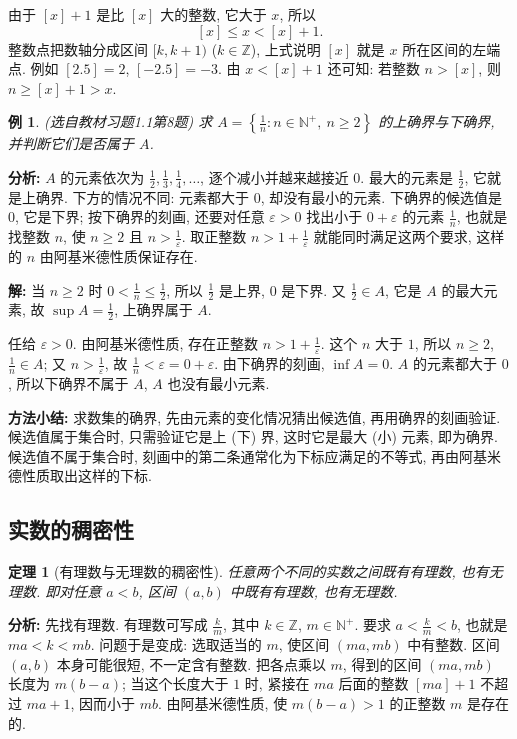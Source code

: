 \documentclass[UTF8,openany]{ctexbook}
\theoremstyle{chinesetextbook}
\newtheorem{example}{例}[section]
\newtheorem{theorem}{定理}[section]
\newenvironment{cnsolution}{\par\indent\textbf{解:} \ignorespaces}{\par}
\begin{document}
由于 $[x]+1$ 是比 $[x]$ 大的整数, 它大于 $x$, 所以
\[
[x]\le x<[x]+1.
\]
整数点把数轴分成区间 $[k,k+1)$ ($k\in\mathbb Z$), 上式说明 $[x]$ 就是 $x$ 所在区间的左端点. 例如 $[2.5]=2$, $[-2.5]=-3$. 由 $x<[x]+1$ 还可知: 若整数 $n>[x]$, 则 $n\ge[x]+1>x$.
\begin{example}
\textnormal{(选自教材习题1.1第8题)} 求 $\displaystyle A=\left\{\frac1n:n\in\mathbb N^+,\ n\ge2\right\}$ 的上确界与下确界, 并判断它们是否属于 $A$.
\end{example}
\par\indent\textbf{分析:} $A$ 的元素依次为 $\displaystyle\frac12,\frac13,\frac14,\ldots$, 逐个减小并越来越接近 $0$. 最大的元素是 $\displaystyle\frac12$, 它就是上确界. 下方的情况不同: 元素都大于 $0$, 却没有最小的元素. 下确界的候选值是 $0$, 它是下界; 按下确界的刻画, 还要对任意 $\varepsilon>0$ 找出小于 $0+\varepsilon$ 的元素 $\displaystyle\frac1n$, 也就是找整数 $n$, 使 $n\ge2$ 且 $\displaystyle n>\frac1\varepsilon$. 取正整数 $\displaystyle n>1+\frac1\varepsilon$ 就能同时满足这两个要求, 这样的 $n$ 由阿基米德性质保证存在.
\begin{cnsolution}
当 $n\ge2$ 时 $\displaystyle0<\frac1n\le\frac12$, 所以 $\displaystyle\frac12$ 是上界, $0$ 是下界. 又 $\displaystyle\frac12\in A$, 它是 $A$ 的最大元素, 故 $\displaystyle\sup A=\frac12$, 上确界属于 $A$.

任给 $\varepsilon>0$. 由阿基米德性质, 存在正整数 $\displaystyle n>1+\frac1\varepsilon$. 这个 $n$ 大于 $1$, 所以 $n\ge2$, $\displaystyle\frac1n\in A$; 又 $\displaystyle n>\frac1\varepsilon$, 故 $\displaystyle\frac1n<\varepsilon=0+\varepsilon$. 由下确界的刻画, $\inf A=0$. $A$ 的元素都大于 $0$, 所以下确界不属于 $A$, $A$ 也没有最小元素.
\end{cnsolution}
\par\indent\textbf{方法小结:} 求数集的确界, 先由元素的变化情况猜出候选值, 再用确界的刻画验证. 候选值属于集合时, 只需验证它是上 (下) 界, 这时它是最大 (小) 元素, 即为确界. 候选值不属于集合时, 刻画中的第二条通常化为下标应满足的不等式, 再由阿基米德性质取出这样的下标.
\subsection{实数的稠密性}
\begin{theorem}[有理数与无理数的稠密性]
任意两个不同的实数之间既有有理数, 也有无理数. 即对任意 $a<b$, 区间 $(a,b)$ 中既有有理数, 也有无理数.
\end{theorem}
\par\indent\textbf{分析:} 先找有理数. 有理数可写成 $\displaystyle\frac km$, 其中 $k\in\mathbb Z$, $m\in\mathbb N^+$. 要求 $\displaystyle a<\frac km<b$, 也就是 $ma<k<mb$. 问题于是变成: 选取适当的 $m$, 使区间 $(ma,mb)$ 中有整数. 区间 $(a,b)$ 本身可能很短, 不一定含有整数. 把各点乘以 $m$, 得到的区间 $(ma,mb)$ 长度为 $m(b-a)$; 当这个长度大于 $1$ 时, 紧接在 $ma$ 后面的整数 $[ma]+1$ 不超过 $ma+1$, 因而小于 $mb$. 由阿基米德性质, 使 $m(b-a)>1$ 的正整数 $m$ 是存在的.
\end{document}

